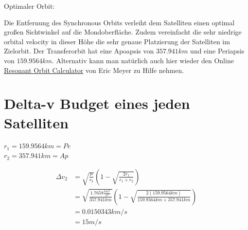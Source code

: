 \documentclass[12pt,paper=A4,numbers=noenddot,bibliography=totoc,listof=totoc,DIV=11,BCOR=1mm]{scrreprt}
\begin{document}
\begin{flushleft}
Optimaler Orbit:
\end{flushleft}
Die Entfernung des Synchronous Orbits verleiht dem Satelliten einen optimal großen Sichtwinkel auf die Mondoberfläche. Zudem vereinfacht die sehr niedrige orbital velocity in dieser Höhe die sehr genaue Platzierung der Satelliten im Zielorbit. Der Transferorbit hat eine Apoapsis von $357.941km$ und eine Periapsis von $159.9564km$. Alternativ kann man natürlich auch hier wieder den Online \href{https://meyerweb.com/eric/ksp/resonant-orbits/}{Resonant Orbit Calculator} von Eric Meyer zu Hilfe nehmen.

\section{Delta-v Budget eines jeden Satelliten}
\begin{flushright}
$r_{1} = 159.9564km = Pe$ \\
$r_{2} = 357.941km = Ap$
\end{flushright}
\begin{equation*}
\begin{split}
\Delta v_{2} &= \sqrt{\frac{\mu}{r_{2}}} \left( 1-\sqrt{\frac{2r_{1}}{r_{1}+r_{2}}} \right) \\
             &= \sqrt{\frac{1.7658 \frac{km^{3}}{s^{2}}}{357.941km}} \left( 1-\sqrt{\frac{2(159.9564km)}{159.9564km + 357.941km}} \right) \\
             &= 0.0150343 km/s \\
             &= 15 m/s
\end{split}
\end{equation*}
\end{document}
